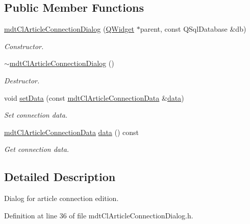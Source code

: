 \subsection*{Public Member Functions}
\begin{DoxyCompactItemize}
\item 
\hyperlink{classmdt_cl_article_connection_dialog_abc1ee29dfcae7f653a4969636014a354}{mdt\-Cl\-Article\-Connection\-Dialog} (\hyperlink{class_q_widget}{Q\-Widget} $\ast$parent, const Q\-Sql\-Database \&db)
\begin{DoxyCompactList}\small\item\em Constructor. \end{DoxyCompactList}\item 
\hyperlink{classmdt_cl_article_connection_dialog_acc899bf48e5f7637d9a04e57553fd718}{$\sim$mdt\-Cl\-Article\-Connection\-Dialog} ()
\begin{DoxyCompactList}\small\item\em Destructor. \end{DoxyCompactList}\item 
void \hyperlink{classmdt_cl_article_connection_dialog_a2cccdff30a974a2bfb71c8603484f00b}{set\-Data} (const \hyperlink{classmdt_cl_article_connection_data}{mdt\-Cl\-Article\-Connection\-Data} \&\hyperlink{classmdt_cl_article_connection_dialog_a116043b66b6d34281ee7200834a97903}{data})
\begin{DoxyCompactList}\small\item\em Set connection data. \end{DoxyCompactList}\item 
\hyperlink{classmdt_cl_article_connection_data}{mdt\-Cl\-Article\-Connection\-Data} \hyperlink{classmdt_cl_article_connection_dialog_a116043b66b6d34281ee7200834a97903}{data} () const 
\begin{DoxyCompactList}\small\item\em Get connection data. \end{DoxyCompactList}\end{DoxyCompactItemize}


\subsection{Detailed Description}
Dialog for article connection edition. 

Definition at line 36 of file mdt\-Cl\-Article\-Connection\-Dialog.\-h.



